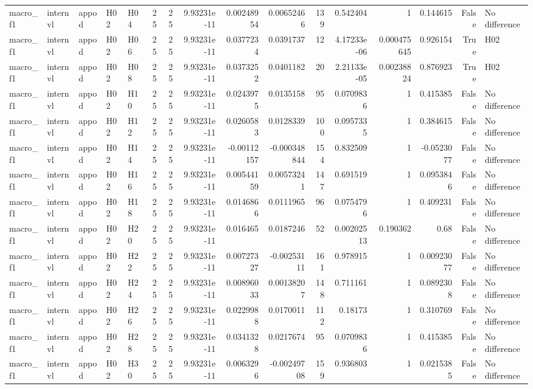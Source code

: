 \begin{longtable}{lllllrrrrrrrrrrl}
macro\_f1 & internvl & appod & H02 & H04 & 25 & 25 & 9.93231e-11 & 0.00248954 & 0.00652466 & 139 & 0.542404 & 1 & 0.144615 & False & No difference \\
macro\_f1 & internvl & appod & H02 & H06 & 25 & 25 & 9.93231e-11 & 0.0377234 & 0.0391737 & 12 & 4.17233e-06 & 0.000475645 & 0.926154 & True & H02 \\
macro\_f1 & internvl & appod & H02 & H08 & 25 & 25 & 9.93231e-11 & 0.0373252 & 0.0401182 & 20 & 2.21133e-05 & 0.00238824 & 0.876923 & True & H02 \\
macro\_f1 & internvl & appod & H02 & H10 & 25 & 25 & 9.93231e-11 & 0.0243975 & 0.0135158 & 95 & 0.0709836 & 1 & 0.415385 & False & No difference \\
macro\_f1 & internvl & appod & H02 & H12 & 25 & 25 & 9.93231e-11 & 0.0260583 & 0.0128339 & 100 & 0.0957335 & 1 & 0.384615 & False & No difference \\
macro\_f1 & internvl & appod & H02 & H14 & 25 & 25 & 9.93231e-11 & -0.00112157 & -0.000348844 & 154 & 0.832509 & 1 & -0.0523077 & False & No difference \\
macro\_f1 & internvl & appod & H02 & H16 & 25 & 25 & 9.93231e-11 & 0.00544159 & 0.00573241 & 147 & 0.691519 & 1 & 0.0953846 & False & No difference \\
macro\_f1 & internvl & appod & H02 & H18 & 25 & 25 & 9.93231e-11 & 0.0146866 & 0.0111965 & 96 & 0.0754796 & 1 & 0.409231 & False & No difference \\
macro\_f1 & internvl & appod & H02 & H20 & 25 & 25 & 9.93231e-11 & 0.016465 & 0.0187246 & 52 & 0.00202513 & 0.190362 & 0.68 & False & No difference \\
macro\_f1 & internvl & appod & H02 & H22 & 25 & 25 & 9.93231e-11 & 0.00727327 & -0.00253111 & 161 & 0.978915 & 1 & 0.00923077 & False & No difference \\
macro\_f1 & internvl & appod & H02 & H24 & 25 & 25 & 9.93231e-11 & 0.00896033 & 0.00138207 & 148 & 0.711161 & 1 & 0.0892308 & False & No difference \\
macro\_f1 & internvl & appod & H02 & H26 & 25 & 25 & 9.93231e-11 & 0.0229988 & 0.0170011 & 112 & 0.18173 & 1 & 0.310769 & False & No difference \\
macro\_f1 & internvl & appod & H02 & H28 & 25 & 25 & 9.93231e-11 & 0.0341328 & 0.0217674 & 95 & 0.0709836 & 1 & 0.415385 & False & No difference \\
macro\_f1 & internvl & appod & H02 & H30 & 25 & 25 & 9.93231e-11 & 0.0063296 & -0.00249708 & 159 & 0.936803 & 1 & 0.0215385 & False & No difference \\

\end{longtable}
